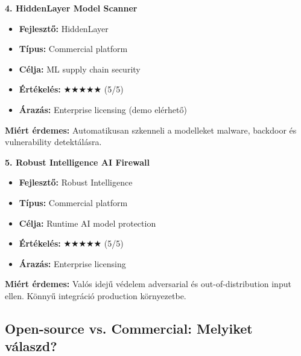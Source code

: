 \documentclass{../templates/magazine}
\begin{document}
\textbf{4. HiddenLayer Model Scanner}
\begin{itemize}
    \item \textbf{Fejlesztő:} HiddenLayer
    \item \textbf{Típus:} Commercial platform
    \item \textbf{Célja:} ML supply chain security
    \item \textbf{Értékelés:} ★★★★★ (5/5)
    \item \textbf{Árazás:} Enterprise licensing (demo elérhető)
\end{itemize}

\textbf{Miért érdemes:} Automatikusan szkenneli a modelleket malware, backdoor és vulnerability detektálásra.

\vspace{0.5cm}

\textbf{5. Robust Intelligence AI Firewall}
\begin{itemize}
    \item \textbf{Fejlesztő:} Robust Intelligence
    \item \textbf{Típus:} Commercial platform
    \item \textbf{Célja:} Runtime AI model protection
    \item \textbf{Értékelés:} ★★★★★ (5/5)
    \item \textbf{Árazás:} Enterprise licensing
\end{itemize}

\textbf{Miért érdemes:} Valós idejű védelem adversarial és out-of-distribution input ellen. Könnyű integráció production környezetbe.

\subsection{Open-source vs. Commercial: Melyiket válaszd?}

\end{document}
